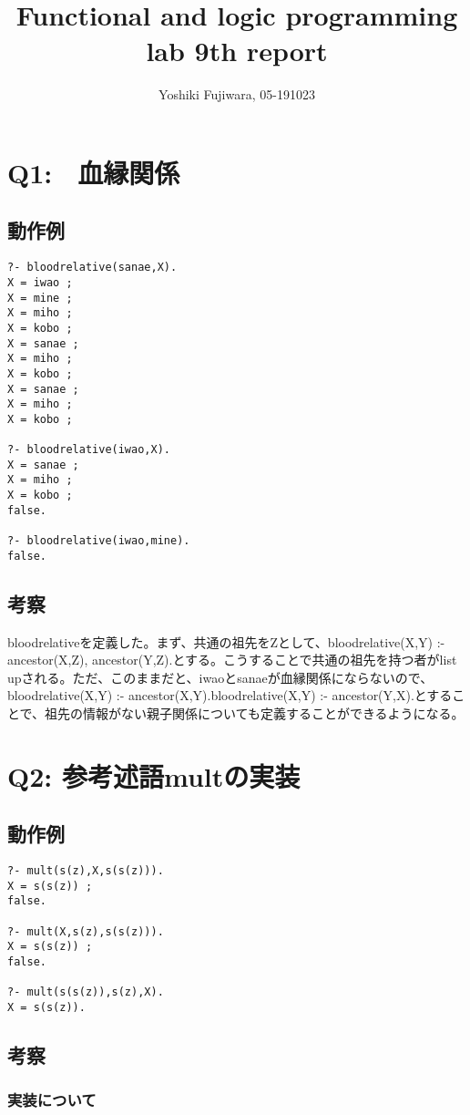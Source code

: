 \documentclass[uplatex,12pt]{jsarticle}
\title {Functional and logic programming lab 9th report}
\date{}
\begin{document}
\author{Yoshiki Fujiwara, 05-191023}
\maketitle
\section{Q1:　血縁関係}
\subsection{動作例}
\begin{lstlisting}[caption=動作例]
?- bloodrelative(sanae,X).
X = iwao ;
X = mine ;
X = miho ;
X = kobo ;
X = sanae ;
X = miho ;
X = kobo ;
X = sanae ;
X = miho ;
X = kobo ;

?- bloodrelative(iwao,X).
X = sanae ;
X = miho ;
X = kobo ;
false.

?- bloodrelative(iwao,mine).
false.
\end{lstlisting}
\subsection{考察}
bloodrelativeを定義した。まず、共通の祖先をZとして、bloodrelative(X,Y) :- ancestor(X,Z), ancestor(Y,Z).とする。こうすることで共通の祖先を持つ者がlist upされる。ただ、このままだと、iwaoとsanaeが血縁関係にならないので、bloodrelative(X,Y) :- ancestor(X,Y).bloodrelative(X,Y) :- ancestor(Y,X).とすることで、祖先の情報がない親子関係についても定義することができるようになる。


\section{Q2: 参考述語multの実装}
\subsection{動作例}
\begin{lstlisting}[caption=動作例]
?- mult(s(z),X,s(s(z))).
X = s(s(z)) ;
false.

?- mult(X,s(z),s(s(z))).
X = s(s(z)) ;
false.

?- mult(s(s(z)),s(z),X).
X = s(s(z)).

\end{lstlisting}
\subsection{考察}
\subsubsection{実装について}
\end{document}
